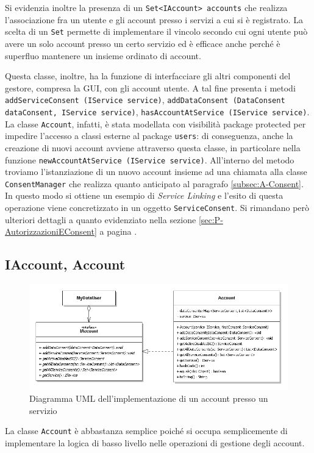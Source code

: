 Si evidenzia inoltre la presenza di un \texttt{Set<IAccount> accounts} che realizza l’associazione fra un utente e gli account presso i servizi a cui si \`e registrato. La scelta di un \texttt{Set} permette di implementare il vincolo secondo cui ogni utente pu\`o avere un solo account presso un certo servizio ed \`e efficace anche perch\'e \`e superfluo mantenere un insieme ordinato di account.

Questa classe, inoltre, ha la funzione di interfacciare gli altri componenti del gestore, compresa la GUI, con gli account utente. A tal fine presenta i metodi \texttt{addServiceConsent (IService service)}, \texttt{addDataConsent (DataConsent dataConsent, IService service)}, \texttt{hasAccountAtService (IService service)}.  La classe \texttt{Account}, infatti, \`e stata modellata con visibilit\`a package protected per impedire l’accesso a classi esterne al package \texttt{users}: di conseguenza, anche la creazione di nuovi account avviene attraverso questa classe, in particolare nella funzione \texttt{newAccountAtService (IService service)}. All’interno del metodo troviamo l’istanziazione di un nuovo account insieme ad una chiamata alla classe \texttt{ConsentManager} che realizza quanto anticipato al paragrafo \ref{subsec:A-Consent}. In questo modo si ottiene un esempio di \textit{Service Linking} e l’esito di questa operazione viene concretizzato in un oggetto \texttt{ServiceConsent}. Si rimandano per\`o ulteriori dettagli a quanto evidenziato nella sezione \ref{sec:P-AutorizzazioniEConsent} a pagina \pageref{sec:P-AutorizzazioniEConsent}.

\subsection{IAccount, Account}
\label{subsec:P-Account}
\begin{figure} [h]
	\centering
	\includegraphics[width=0.95\linewidth]{pictures/Accounting-Account.png}
	\caption{Diagramma UML dell'implementazione di un account presso un servizio}
	\label{fig:Accounting-Account}
\end{figure}
La classe \texttt{Account} \`e abbastanza semplice poich\'e si occupa semplicemente di implementare la logica di basso livello nelle operazioni di gestione degli account.

